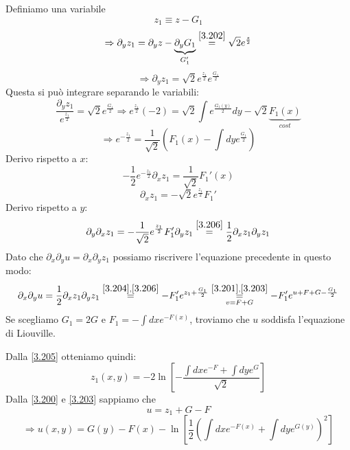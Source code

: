 \documentclass[a4paper,11pt]{report}
\begin{document}
Definiamo una variabile
\begin{equation}
z_1 \equiv z-G_1
\label{3.203}
\end{equation}
\[
\Rightarrow \partial_y z_1 = \partial_y z- \underbrace{\partial_y G_1}_{G_1'}\overset{\eqref{3.202}}{=}\sqrt{2}e^\frac{z}{2}
\]
\begin{equation}
\Rightarrow \partial_y z_1=\sqrt{2}e^{\frac{z_1}{2}}e^{\frac{G_1}{2}} 
\label{3.204}
\end{equation}
Questa si pu\`o integrare separando le variabili:
\[
\frac{\partial_y z_1}{e^{\frac{z_1}{2}}}=\sqrt{2}e^{\frac{G_1}{2}} \Rightarrow e^{\frac{z_1}{2}} (-2)=\sqrt{2}\int e^{\frac{G_1(y)}{2}} dy - \sqrt{2} \underbrace{F_1(x)}_{cost}
\]
\begin{equation}
\Rightarrow e^{-\frac{z_1}{2}}=\frac{1}{\sqrt{2}}\left(F_1(x) - \int dy e^{\frac{G_1}{2}}\right) 
\label{3.205}
\end{equation}
Derivo rispetto a $x$:
\[
-\frac{1}{2} e^{-\frac{z_1}{2}} \partial_x z_1=\frac{1}{\sqrt{2}}F_1'(x) 
\]
\begin{equation}
\partial_x z_1 = -\sqrt{2}e^{\frac{z_1}{2}}F_1' 
\label{3.206}
\end{equation}
Derivo rispetto a $y$:
\[
\partial_y \partial_x z_1 = -\frac{1}{\sqrt{2}}e^{\frac{z_1}{2}} F_1' \partial_y z_1\overset{\eqref{3.206}}{=} \frac{1}{2}\partial_x z_1 \partial_y z_1
\]
Dato che $\partial_x\partial_y u = \partial_x\partial_y z_1$ possiamo riscrivere l'equazione precedente in questo modo:
\begin{equation}
\partial_x\partial_y u =\frac{1}{2} \partial_x z_1 \partial_y z_1 \overset{\eqref{3.204},\eqref{3.206}}{=} -F_1' e^{z_1 + \frac{G_1}{2}} \overset{\eqref{3.201},\eqref{3.203}}{\underset{v=F+G}{=}} -F_1'e^{u+F+G-\frac{G_1}{2}} 
\label{3.207}
\end{equation}
Se scegliamo $G_1=2G$ e $F_1=-\int dx e^{-F(x)}$, troviamo che $u$ soddisfa l'equazione di Liouville.

Dalla \eqref{3.205} otteniamo quindi:
\begin{equation}
z_1(x,y)=-2\ln \left[-\frac{\int dx e^{-F} + \int dy e^G}{\sqrt{2}} \right] 
\label{3.208}
\end{equation}
Dalla \eqref{3.200} e \eqref{3.203} sappiamo che
\[
u=z_1+G-F
\]
\begin{equation}
\Rightarrow u(x,y)=G(y)-F(x) - \ln\left[\frac{1}{2}\left(\int dx e^{-F(x)} + \int dy e^{G(y)}\right)^2 \right] 
\label{3.209}
\end{equation}
\end{document}
